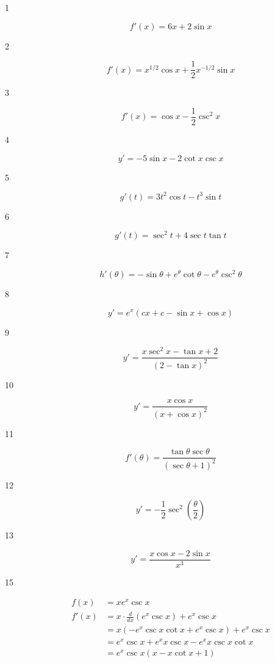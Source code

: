 \documentclass[letterpaper]{exam}
\begin{document}
  \begin{description}

    \item[1] 
      \[
        f'(x) = \boxed{ 6x + 2 \sin x }
      \]

    \item[2] 
      \[
        f'(x) = \boxed{ x^{1/2} \cos{x} + \frac{1}{2} x^{-1/2} \sin x }
      \]

    \item[3] 
      \[
        f'(x) = \boxed{ \cos x - \frac{1}{2} \csc^2 x }
      \]

    \item[4] 
      \[
        y' = \boxed{ - 5 \sin x - 2 \cot x \csc x }
      \]

    \item[5] 
      \[
        g'(t) = \boxed{ 3 t^2 \cos t - t^3 \sin t }
      \]

    \item[6] 
      \[
        g'(t) = \boxed{ \sec^2 t + 4 \sec t \tan t }
      \]

    \item[7] 
      \[
        h'(\theta) = \boxed{ - \sin \theta + e^{\theta} \cot \theta - e^{\theta} \csc^2 \theta }
      \]

    \item[8] 
      \[
        y' = \boxed{ e^x (c x + c - \sin x + \cos x) }
      \]

    \item[9] 
      \[
        y' = \boxed{ \frac{ x \sec^2 x - \tan x + 2}{( 2 - \tan x )^2} }
      \]

    \item[10] 
      \[
        y' = \boxed{ \frac{x \cos x}{(x + \cos x)^2} }
      \]

    \item[11] 
      \[
        f'(\theta) = \boxed{ \frac{\tan \theta \sec \theta}{(\sec \theta + 1)^2} }
      \]

    \item[12] 
      \[
        y' = \boxed{ -\frac{1}{2} \sec^2 \left( \frac{\theta}{2} \right) }
      \]

    \item[13] 
      \[
        y' = \boxed{ \frac{x \cos x - 2 \sin x}{x^3} }
      \]

    \item[15] 
      \begin{align*}
        f(x)  & = x e^x \csc x \\
        f'(x) & = x \cdot \frac{d}{dx} \left( e^x \csc x \right) + e^x \csc x \\
              & = x \left( - e^x \csc x \cot x + e^x \csc x  \right)+ e^x \csc x \\
              & = e^x \csc x + e^x x \csc x - e^x x \csc x \cot x \\
              & = \boxed{ e^x \csc x \left( x - x \cot x + 1 \right) } \\
      \end{align*}


\end{description}
\end{document}
